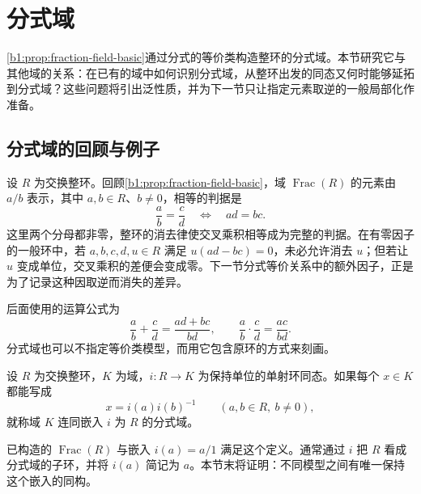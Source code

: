 
\section{分式域}
\label{b1:sec:1301}

\cref{b1:prop:fraction-field-basic}通过分式的等价类构造整环的分式域。本节研究它与其他域的关系：在已有的域中如何识别分式域，从整环出发的同态又何时能够延拓到分式域？这些问题将引出泛性质，并为下一节只让指定元素取逆的一般局部化作准备。

%
%

\subsection{分式域的回顾与例子}
\label{b1:subsec:1301:01}

设 \(R\) 为交换整环。回顾\cref{b1:prop:fraction-field-basic}，域 \(\operatorname{Frac}(R)\) 的元素由 \(a/b\) 表示，其中 \(a,b\in R\)、\(b\neq0\)，相等的判据是
\begin{equation}\label{b1:eq:fraction-equivalence}
	\frac ab=\frac cd\quad\Longleftrightarrow\quad ad=bc.
\end{equation}
这里两个分母都非零，整环的消去律使交叉乘积相等成为完整的判据。在有零因子的一般环中，若 \(a,b,c,d,u\in R\) 满足 \(u(ad-bc)=0\)，未必允许消去 \(u\)；但若让 \(u\) 变成单位，交叉乘积的差便会变成零。下一节分式等价关系中的额外因子，正是为了记录这种因取逆而消失的差异。

\ProseParagraphBreak
后面使用的运算公式为
\begin{equation}\label{b1:eq:fraction-operations}
	\frac ab+\frac cd=\frac{ad+bc}{bd}, \qquad \frac ab\cdot\frac cd=\frac{ac}{bd}.
\end{equation}
分式域也可以不指定等价类模型，而用它包含原环的方式来刻画。

\begin{definition}\label{b1:def:fraction-field}
	设 \(R\) 为交换整环，\(K\) 为域，\(i:R\rightarrow K\) 为保持单位的单射环同态。如果每个 \(x\in K\) 都能写成
	\[
		x=i(a)i(b)^{-1}\qquad(a,b\in R,\ b\neq0),
	\]
	就称域 \(K\) 连同嵌入 \(i\) 为 \(R\) 的分式域。
\end{definition}
已构造的 \(\operatorname{Frac}(R)\) 与嵌入 \(i(a)=a/1\) 满足这个定义。通常通过 \(i\) 把 \(R\) 看成分式域的子环，并将 \(i(a)\) 简记为 \(a\)。本节末将证明：不同模型之间有唯一保持这个嵌入的同构。

